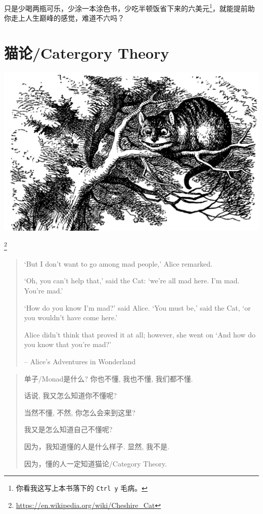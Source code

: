 \documentclass[letterspacing]{tufte-book}
\begin{document}
只是少喝两瓶可乐，少涂一本涂色书，少吃半顿饭省下来的六美元\footnote{你看我这写上本书落下的 \texttt{Ctrl y} 毛病。}，就能提前助你走上人生巅峰的感觉，难道不六吗？


\part{猫论/Catergory Theory}
\label{sec:orga332599}

\begin{center}
\includegraphics[width=.9\linewidth]{./images/Cheshire_Cat.png}
\end{center} \footnote{\url{https://en.wikipedia.org/wiki/Cheshire\_Cat}}

\begin{quote}
`But I don’t want to go among mad people,’ Alice remarked.

`Oh, you can’t help that,’ said the Cat: `we’re all mad here. I’m mad. You’re mad.’

`How do you know I’m mad?’ said Alice.
`You must be,’ said the Cat, `or you wouldn’t have come here.’

Alice didn’t think that proved it at all; however, she went on `And how do you know that you’re mad?’

-- Alice's Adventures in Wonderland
\end{quote}

\begin{quote}
单子/Monad是什么? 你也不懂, 我也不懂, 我们都不懂.

话说, 我又怎么知道你不懂呢?

当然不懂, 不然, 你怎么会来到这里?

我又是怎么知道自己不懂呢?

因为，我知道懂的人是什么样子. 显然, 我不是.

因为，懂的人一定知道猫论/Category Theory.
\end{quote}
\end{document}
